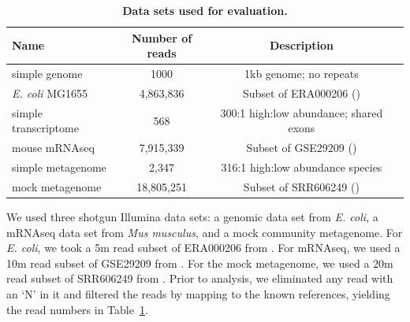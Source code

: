 \begin{table}
\small
\centering
\begin{tabular}{|l|c|c|l|}
\hline
Name & Number of reads & Description \\
\hline
simple genome & 1000 & 1kb genome; no repeats \\
{\em E. coli} MG1655 & 4,863,836 & Subset of ERA000206 (\cite{chitsaz}) \\
simple transcriptome & 568 & 300:1 high:low abundance; shared exons \\
mouse mRNAseq & 7,915,339 & Subset of GSE29209 (\cite{trinityrna}) \\
simple metagenome & 2,347 & 316:1 high:low abundance species \\
mock metagenome & 18,805,251 & Subset of SRR606249 (\cite{podar}) \\
\hline
\end{tabular}

\caption{{\bf Data sets used for evaluation.}}

\label{tab:data}
\end{table}



We used three shotgun Illumina data sets: a genomic data set from {\em E.
coli}, a mRNAseq data set from {\em Mus musculus}, and a mock community
metagenome.  For {\em E. coli}, we took a 5m read subset of ERA000206 from
\cite{chitsaz}.  For mRNAseq, we used a 10m read subset of GSE29209 from
\cite{trinityrna}.  For the mock metagenome, we used a 20m read subset of
SRR606249 from \cite{podar}.  Prior to analysis, we eliminated any read with an
`N' in it and filtered the reads by mapping to the known references, yielding
the read numbers in Table~\ref{tab:data}.

